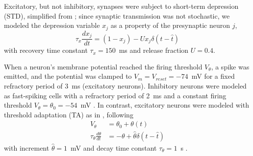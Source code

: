 \documentclass[9pt,lineno,onehalfspacing]{elife}
\begin{document}
Excitatory, but not inhibitory, synapses were subject to short-term depression (STD), simplified from \cite{Tsodyks1997-qt}; since synaptic transmission was not stochastic, we modeled the depression variable $x_j$ as a property of the presynaptic neuron $j$,
\begin{equation}
    \tau_x \frac{dx_j}{dt} = (1-x_j) - U x_j \delta(t - \hat{t}) \label{eq:xsyn}
\end{equation}
with recovery time constant $\tau_x = 150$~ms and release fraction $U = 0.4$.

When a neuron's membrane potential reached the firing threshold $V_\theta$, a spike was emitted, and the potential was clamped to $V_m = V_{reset} = -74$~mV for a fixed refractory period of 3~ms (excitatory neurons). Inhibitory neurons were modeled as fast-spiking cells with a refractory period of 2~ms and a constant firing threshold $V_\theta = \theta_0 = -54$~mV \citep{Mensi2012-au}. In contrast, excitatory neurons were modeled with threshold adaptation (TA) as in \cite{Teeter2018-iz}, following
\begin{align}
    V_\theta &= \theta_0 + \theta(t) \nonumber \\
    \tau_{\theta} \frac{d\theta}{dt} &= -\theta + \hat{\theta} \delta(t - \hat{t}) \label{eq:TA}
\end{align}
with increment $\hat{\theta} = 1$~mV and decay time constant $\tau_{\theta} = 1$~s \citep{Henze2001-xd, Pozzorini2015-ei}.
\end{document}
